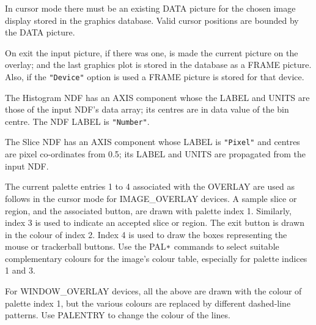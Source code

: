 \documentclass[twoside,11pt,nolof]{starlink}
\providecommand{\lsk}{\raisebox{-0.4ex}{\rm *}}
\begin{document}
{{{         \sstitem
         In cursor mode there must be an existing DATA picture for the
         chosen image display stored in the graphics database.  Valid
         cursor positions are bounded by the DATA picture.

         \sstitem
         On exit the input picture, if there was one, is made the
         current picture on the overlay; and the last graphics plot is
         stored in the database as a FRAME picture.  Also, if the
         \texttt{"Device"} option is used a FRAME picture is stored for
         that device.

         \sstitem
         The Histogram NDF has an AXIS component whose the LABEL and
         UNITS are those of the input NDF's data array; its centres are
         in data value of the bin centre.  The NDF LABEL is \texttt{"Number"}.

         \sstitem
         The Slice NDF has an AXIS component whose LABEL is \texttt{"Pixel"} and
         centres are pixel co-ordinates from 0.5; its LABEL and UNITS are
         propagated from the input NDF.

         \sstitem
         The current palette entries 1 to 4 associated with the OVERLAY
         are used as follows in the cursor mode for IMAGE\_OVERLAY devices.
         A sample slice or region, and the associated button, are drawn
         with palette index 1.  Similarly, index 3 is used to indicate an
         accepted slice or region.  The exit button is drawn in the colour
         of index 2.  Index 4 is used to draw the boxes representing the
         mouse or trackerball buttons.  Use the PAL$\lsk$ commands to select
         suitable complementary colours for the image's colour table,
         especially for palette indices 1 and 3.

         For WINDOW\_OVERLAY devices, all the above are drawn with the
         colour of palette index 1, but the various colours are replaced
         by different dashed-line patterns.  Use PALENTRY to change the
         colour of the lines.
      }
   }
}
\end{document}
